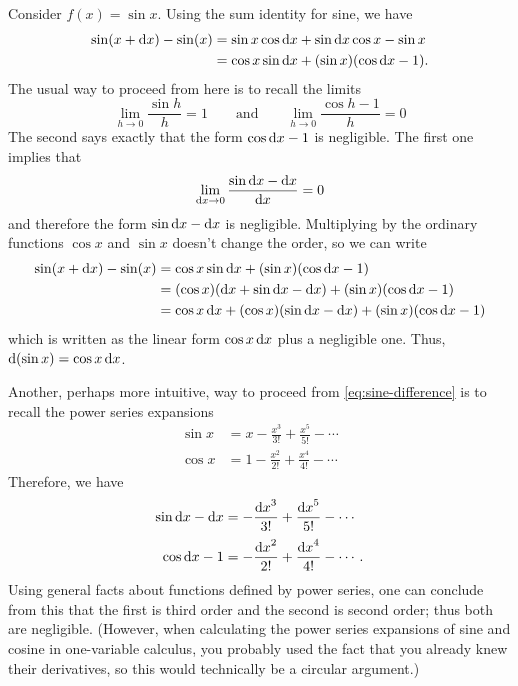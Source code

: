 \begin{eg}
  Consider $f(x) = \sin x$.
  Using the sum identity for sine, we have
  \begin{align}
    \sin(x+{\mathrm{d} x}) - \sin (x)
    &= \sin x \cos {\ensuremath{\mathrm{d} x}} + \sin {\ensuremath{\mathrm{d} x}} \cos x - \sin x \notag\\
    &= \cos x \sin {\ensuremath{\mathrm{d} x}} + (\sin x) (\cos {\ensuremath{\mathrm{d} x}} - 1).\label{eq:sine-difference}
  \end{align}
  The usual way to proceed from here is to recall the limits
  \[ \lim_{h\to 0} \frac{\sin h}{h} = 1 \qquad\text{and}\qquad
  \lim_{h\to 0} \frac{\cos h - 1}{h} = 0 \]
  The second says exactly that the form $\cos {\ensuremath{\mathrm{d} x}} - 1$ is negligible.
  The first one implies that
  \[ \lim_{{\mathrm{d} x}\to 0} \frac{\sin {\ensuremath{\mathrm{d} x}} - {\mathrm{d} x}}{{\mathrm{d} x}} = 0 \]
  and therefore the form $\sin {\ensuremath{\mathrm{d} x}} - {\mathrm{d} x}$ is negligible.
  Multiplying by the ordinary functions $\cos x$ and $\sin x$ doesn't change the order, so we can write
  \begin{align*}
    \sin(x+{\mathrm{d} x}) - \sin (x)
    &= \cos x \sin {\ensuremath{\mathrm{d} x}} + (\sin x) (\cos {\ensuremath{\mathrm{d} x}} - 1)\\
    &= (\cos x )({\mathrm{d} x}  + \sin {\ensuremath{\mathrm{d} x}} - {\mathrm{d} x}) + (\sin x) (\cos {\ensuremath{\mathrm{d} x}} - 1)\\
    &= \cos x \,{\mathrm{d} x} + (\cos x) (\sin {\ensuremath{\mathrm{d} x}} - {\mathrm{d} x}) + (\sin x) (\cos {\ensuremath{\mathrm{d} x}} - 1)
  \end{align*}
  which is written as the linear form $\cos x \,{\mathrm{d} x}$ plus a negligible one.
  Thus, $\mathrm{d}(\sin x) = \cos x \,{\mathrm{d} x}$.

  Another, perhaps more intuitive, way to proceed from \cref{eq:sine-difference} is to recall the power series expansions
  \begin{align*}
    \sin x &= x - \frac{x^3}{3!} + \frac{x^5}{5!} - \cdots\\[2pt]
    \cos x &= 1 - \frac{x^2}{2!} + \frac{x^4}{4!} - \cdots
  \end{align*}
  Therefore, we have
  \begin{align*}
    \sin {\ensuremath{\mathrm{d} x}} - {\mathrm{d} x} &= - \frac{{\mathrm{d} x}^3}{3!} + \frac{{\mathrm{d} x}^5}{5!} - \cdots\\[2pt]
    \cos {\ensuremath{\mathrm{d} x}} - 1 &= - \frac{{\mathrm{d} x}^2}{2!} + \frac{{\mathrm{d} x}^4}{4!} - \cdots.
  \end{align*}
  Using general facts about functions defined by power series, one can conclude from this that the first is third order and the second is second order; thus both are negligible.
  (However, when calculating the power series expansions of sine and cosine in one-variable calculus, you probably used the fact that you already knew their derivatives, so this would technically be a circular argument.)
\end{eg}

